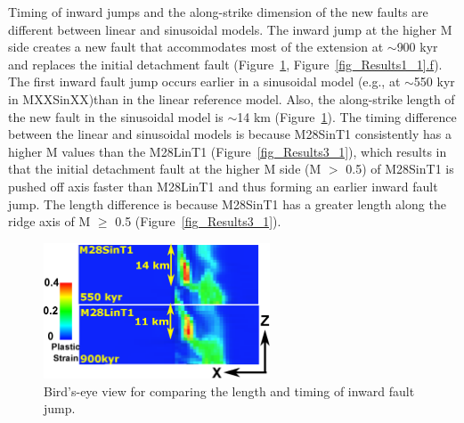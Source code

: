 Timing of inward jumps and the along-strike dimension of the new faults are different between linear and sinusoidal models. The inward jump at the higher M side creates a new fault that accommodates most of the extension at $\sim$900 kyr and replaces the initial detachment fault (Figure~\hyperref[fig_Results4_2]{\ref{fig_Results4_2}}, Figure~\hyperref[fig_Results1_1]{\ref{fig_Results1_1}.f}).
The first inward fault jump occurs earlier in a sinusoidal model (e.g., at $\sim$550 kyr in MXXSinXX)than in the linear reference model. Also, the along-strike length of the new fault in the sinusoidal model is $\sim$14 km (Figure~\hyperref[fig_Results4_2]{\ref{fig_Results4_2}}).
%
The timing difference between the linear and sinusoidal models is because M28SinT1 consistently has a higher M values than the M28LinT1 (Figure~\hyperref[fig_Results3_1]{\ref{fig_Results3_1}}), which results in that the initial detachment fault at the higher M side (M $>$ 0.5) of M28SinT1 is pushed off axis faster than M28LinT1 and thus forming an earlier inward fault jump. The length difference is because M28SinT1 has a greater length along the ridge axis of M $\ge$ 0.5 (Figure~\hyperref[fig_Results3_1]{\ref{fig_Results3_1}}). 
%
\begin{figure}[h]
  \centering
    \includegraphics[width=0.6\textwidth]{./Figures/fig_Results4_2_secondary_fault_length_comparison1.eps}
  \caption{Bird's-eye view for comparing the length and timing of inward fault jump.}
 \label{fig_Results4_2}
\end{figure}

